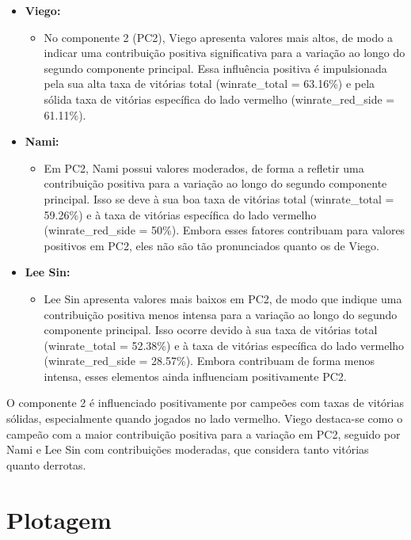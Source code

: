 \documentclass[a4paper,12pt]{article}
\begin{document}
\begin{itemize}
    \item \textbf{Viego:}
    \begin{itemize}
        \item No componente 2 (PC2), Viego apresenta valores mais altos, de modo a indicar uma contribuição positiva significativa para a variação ao longo do segundo componente principal. Essa influência positiva é impulsionada pela sua alta taxa de vitórias total (winrate\_total = 63.16\%) e pela sólida taxa de vitórias específica do lado vermelho (winrate\_red\_side = 61.11\%).
    \end{itemize}
    \pagebreak
    
    \item \textbf{Nami:}
    \begin{itemize}
        \item Em PC2, Nami possui valores moderados, de forma a refletir uma contribuição positiva para a variação ao longo do segundo componente principal. Isso se deve à sua boa taxa de vitórias total (winrate\_total = 59.26\%) e à taxa de vitórias específica do lado vermelho (winrate\_red\_side = 50\%). Embora esses fatores contribuam para valores positivos em PC2, eles não são tão pronunciados quanto os de Viego.
    \end{itemize}
    
    \item \textbf{Lee Sin:}
    \begin{itemize}
        \item Lee Sin apresenta valores mais baixos em PC2, de modo que indique uma contribuição positiva menos intensa para a variação ao longo do segundo componente principal. Isso ocorre devido à sua taxa de vitórias total (winrate\_total = 52.38\%) e à taxa de vitórias específica do lado vermelho (winrate\_red\_side = 28.57\%). Embora contribuam de forma menos intensa, esses elementos ainda influenciam positivamente PC2.
    \end{itemize}
\end{itemize}

\textbf{} O componente 2 é influenciado positivamente por campeões com taxas de vitórias sólidas, especialmente quando jogados no lado vermelho. Viego destaca-se como o campeão com a maior contribuição positiva para a variação em PC2, seguido por Nami e Lee Sin com contribuições moderadas, que considera tanto vitórias quanto derrotas.

\section{Plotagem}
\end{document}
